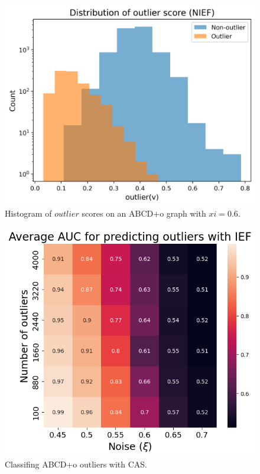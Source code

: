 \documentclass{beamer}
\begin{document}
\begin{frame}{}
    \begin{figure}
        \includegraphics[height=0.75\textheight]{figures/outlier_hist_0.6.png}
        \caption{Histogram of $outlier$ scores on an ABCD+o graph with $xi=0.6$.}
    \end{figure}
\end{frame}
\begin{frame}{}
    \begin{figure}
        \includegraphics[height=0.75\textheight]{figures/outlier-auc-ief.png}
        \caption{Classifing ABCD+o outliers with CAS.}
    \end{figure}
\end{frame}
\end{document}
